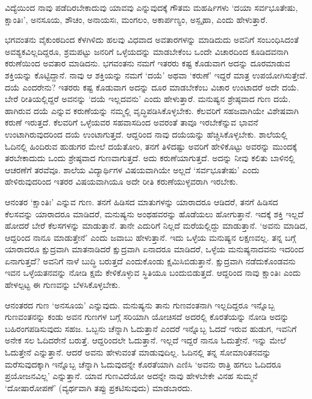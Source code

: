 ವಿದ್ಯೆಯಿಂದ ನಾವು ಪಡೆದಿರಬೇಕಾದುವು ಯಾವವು ಎನ್ನುವುದಕ್ಕೆ ಗೌತಮ ಮಹರ್ಷಿಗಳು `ದಯಾ ಸರ್ವಭೂತೇಷು, ಕ್ಷಾಂತಿಃ', ಅನಸೂಯ, ಶೌಚಂ, 
ಅನಾಯಸಃ, ಮಂಗಲಂ, ಅಕಾರ್ಪಣ್ಯಂ, ಅಸ್ಪೃಹಾ, ಎಂದು ಹೇಳುತ್ತಾರೆ.

ಭಗವಂತನು ವೈಕುಂಠದಿಂದ ಕೆಳಗಿಳಿದು ಹಲವು ವಿಧವಾದ ಅವತಾರಗಳನ್ನು ಮಾಡಿದುದು ಅವನಿಗೆ ಸಂಬಂಧಿಸಿದಂತೆ ಅವಶ್ಯಕವಿಲ್ಲದಿದ್ದರೂ, ಶ್ರಮಪಟ್ಟು ಜನರಿಗೆ 
ಒಳ್ಳೆಯದನ್ನು ಮಾಡಬೇಕೆಂಬ ಒಂದೇ ವಿಚಾರದಿಂದ ಕೂಡಿದವನಾಗಿ ಕರುಣೆಯಿಂದ ಅವತಾರ ಮಾಡಿದನು. ಭಗವಂತನು ನಮಗೆ ಇತರರು ಕಷ್ಟ 
ಕೊಡುವಾಗ ಅದನ್ನು ದೂರಮಾಡುವ ಶಕ್ತಿಯನ್ನು ಕೊಟ್ಟಿದ್ದಾನೆ. ನಾವು ಆ ಶಕ್ತಿಯನ್ನು ನಮಗೆ `ದಯೆ' ಅಥವಾ `ಕರುಣೆ' ಇದ್ದರೆ ಮಾತ್ರ ಉಪಯೋಗಿಸುತ್ತೇವೆ. ದಯೆ 
ಎಂದರೇನು? ಇತರರು ಕಷ್ಟ ಕೊಡುವಾಗ ಅದನ್ನು ದೂರ ಮಾಡಬೇಕೆಂಬ ವಿಚಾರ ಉಂಟಾದರೆ ಅದೇ ದಯೆ. ಬೇರೆ ರೀತಿಯಲ್ಲಿದ್ದರೆ ಅವನನ್ನು `ದಯೆ ಇಲ್ಲದವನು' ಎಂದು 
ಹೇಳುತ್ತಾರೆ. ಮನುಷ್ಯನ ಶ್ರೇಷ್ಠವಾದ ಗುಣ ದಯೆ. ಹಾಗಿರುವ ದಯೆ ಎನ್ನುವ ಕರುಣೆಯನ್ನು ನಮ್ಮಲ್ಲಿ ವೃದ್ಧಿಪಡಿಸಿಕೊಳ್ಳಬೇಕು. ಕೆಲವರಿಗೆ ಸಹಜವಾಗಿಯೇ 
ವಿಶೇಷವಾಗಿ ಕರುಣೆ ಇರುತ್ತದೆ. ಕೆಲವರಿಗೆ ಒಳ್ಳೆಯವರ ಸಹವಾಸದಿಂದ ಅವರಂತೆ ತಾವೂ ಇರಬೇಕೆನ್ನುವ ಭಾವನೆ ಉಂಟಾಗಿರುವುದರಿಂದ ದಯೆ 
ಉಂಟಾಗುತ್ತದೆ. ಆದ್ದರಿಂದ ನಾವು ದಯೆಯನ್ನು ಹೆಚ್ಚಿಸಿಕೊಳ್ಳಬೇಕು. ಶಾಲೆಯಲ್ಲಿ ಓದಿನಲ್ಲಿ ಹಿಂದಿರುವ ಹುಡುಗರ ಮೇಲೆ ದಯೆತೋರಿ, ತನಗೆ ತಿಳಿದಷ್ಟು 
ಅವರಿಗೆ ಹೇಳಿಕೊಟ್ಟು ಅವರನ್ನು ಮುಂದಕ್ಕೆ ತರಬೇಕಾದುದು ಒಂದು ಶ್ರೇಷ್ಠವಾದ ಗುಣವಾಗುತ್ತದೆ. ಅದು ಕರುಣೆಯಾಗುತ್ತದೆ. ಅದನ್ನು ನೀವು ಕಲಿತು ಬಾಳಿನಲ್ಲಿ 
ಆಚರಣೆಗೆ ತರವೆವೂ. ಶಾಲೆಯ ವಿದ್ಯಾರ್ಥಿಗಳ ವಿಷಯವಾಗಿಯೇ ಅಲ್ಲದೆ `ಸರ್ವಭೂತೇಷು' ಎಂದು ಹೇಳಿರುವುದರಿಂದ ಇತರರ ವಿಷಯವಾಗಿಯೂ ಅದೇ ರೀತಿ ಕರುಣೆಯುಳ್ಳವರಾಗಿ ಇರಬೇಕು. 

ಆನಂತರ `ಕ್ಷಾಂತಿಃ' ಎನ್ನುವ ಗುಣ. ತನಗೆ ಹಿಡಿಸದ ಮಾತುಗಳನ್ನು ಯಾರಾದರೂ ಆಡಿದರೆ, ತನಗೆ ಹಿಡಿಸದ ಕೆಲಸವನ್ನು ಯಾರಾದರೂ 
ಮಾಡಿದರೆ, ಮನುಷ್ಯನು ಅಂಥಹವರನ್ನು ಹೊಡೆಯಲು ಹೋಗುತ್ತಾನೆ. ಇದಕ್ಕೆ ಶಕ್ತಿ ಇಲ್ಲದೆ ಹೋದರೆ ಬೇರೆ ಕೆಲಸಗಳನ್ನು ಮಾಡುತ್ತಾನೆ. 
ತಾನೇ ಎದುರಿಗೆ ನಿಲ್ಲದೆ ಮರೆಯಲ್ಲಿದ್ದು ಮಾಡುತ್ತಾನೆ. `ಅವನು ಮಾಡಿದ, ಆದ್ದರಿಂದ ನಾನೂ ಮಾಡುತ್ತೇನೆ' ಎಂದು ಜವಾಬು ಹೇಳುತ್ತಾನೆ. ಇದು ಒಳ್ಳೆಯ 
ಮನುಷ್ಯನ ಲಕ್ಷಣವಲ್ಲ. ತನ್ನ ಬಗ್ಗೆ ಯಾರಾದರೂ ಕ್ಷುದ್ರವಾಗಿ ಮಾತನಾಡಿದರೆ ಕ್ಷುದ್ರವಾಗಿ ಏನಾದರೂ ಮಾಡಿದರೆ, ಒಳ್ಳೆಯ ಮನುಷ್ಯನಾದವನು ಇದರಿಂದ 
ಏನಾಗುತ್ತದೆ? ಅವನಿಗೆ ನಾಳೆ ಬುದ್ಧಿ ಬರುತ್ತದೆ ಎಂದುಕೊಂಡು ಕ್ಷಮಿಸಿಬಿಡುತ್ತಾನೆ. ಕ್ಷುದ್ರವಾಗಿ ನಡೆದುಕೊಂಡವನು ಇವನ ಒಳ್ಳೆಯತನವನ್ನು ನೋಡಿ 
ಕ್ಷಮೆ ಕೇಳಿಕೊಳ್ಳುವ ಸ್ಥಿತಿಯೂ ಬಂದುಬಿಡುತ್ತದೆ. ಆದ್ದರಿಂದ ನಾವು ಕ್ಷಾಂತಿಃ ಎಂದು ಹೇಳಲ್ಪಟ್ಟ ಈ ಗುಣವನ್ನು ಬೆಳಸಿಕೊಳ್ಳಬೇಕು.

ಆನಂತರದ ಗುಣ `ಅನಸೂಯ' ಎನ್ನುವುದು. ಮನುಷ್ಯನು ತಾನು ಗುಣವಂತನಾಗಿ ಇಲ್ಲದಿದ್ದರೂ ಇನ್ನೊಬ್ಬ ಗುಣವಂತನನ್ನು ಕಂಡು ಅವನ ಗುಣಗಳ ಬಗ್ಗೆ ಸರಿಯಾಗಿ 
ಯೋಚಿಸದೆ ಅದರಲ್ಲಿ ಕೊರತೆಯನ್ನು ನೋಡಿ ಅದನ್ನು ಬಹಿರಂಗಪಡಿಸುವುದು ಸಹಜ. ಒಬ್ಬನು ಚೆನ್ನಾಗಿ ಓದುತ್ತಾನೆ ಎಂದರೆ ಇನ್ನೊಬ್ಬ ಓದದೆ ಇರುವ 
ಹುಡುಗ, ಇವನಿಗೆ ಅನೇಕ ಸಲ ಓದಿದರೇನೆ ಬರುತ್ತೆ. ಆದ್ದರಿಂದಲೇ ಓದುತ್ತಾನೆ. ಇಲ್ಲದೆ ಇದ್ದರೆ ನಾನೂ ಓದುತ್ತೇನೆ. ಇನ್ನು ಮೇಲೆ ಓದುತ್ತೇನೆ ಎನ್ನುತ್ತಾನೆ. 
ಆದರೆ ಅವನು ಹೇಳುವಂತೆ ಮಾಡುವುದಿಲ್ಲ. ಓದಿನಲ್ಲಿ ತನ್ನ ಸೋಮಾರಿತನವನ್ನು ಮರೆಸುವುದಕ್ಕಾಗಿ ಇನ್ನೊಬ್ಬ ಚೆನ್ನಾಗಿ ಓದುವುದನ್ನೇ ಕೊರತೆಯಾಗಿ ಎಣಿಸಿ `ಅವನು 
ರಾತ್ರಿ ಹಗಲು ಓದಿದರೂ ಪ್ರಯೋಜನವಿಲ್ಲ' ಎನ್ನುತ್ತಾನೆ. ಯಾವ ಗುಣವಿದೆಯೋ ಅದನ್ನೇ ನಾವು ಹೇಳಬೇಕೇ ವಿನಹ ಸುಮ್ಮನೆ `ದೋಷಾರೋಪಣೆ' (ವ್ಯರ್ಥವಾಗಿ ತಪ್ಪು ಪ್ರಕಟಿಸುವುದು) ಮಾಡಬಾರದು.

